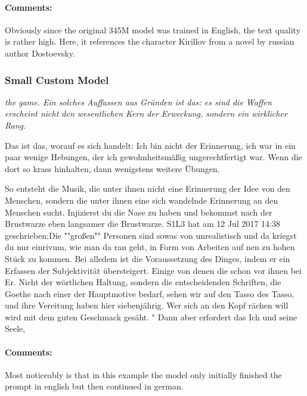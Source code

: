 \documentclass{scrartcl}
\begin{document}
\paragraph{Comments:} Obviously since the original 345M model was trained in English, the text quality is rather high. Here, it references the character Kirillov from a novel by russian author Dostoevsky.

\subsubsection{Small Custom Model}
{\itshape
 the game.
Ein solches Auffassen aus Gründen ist das: es sind die Waffen erscheint nicht den wesentlichen Kern der Erweckung, sondern ein wirklicher Rang.

Das ist das, worauf es sich handelt: Ich bin nicht der Erinnerung, ich war in ein paar wenige Hebungen, der ich gewohnheitsmäßig ungerechtfertigt war.
Wenn die dort so krass hinhalten, dann wenigstens weitere Übungen.

So entsteht die Musik, die unter ihnen nicht eine Erinnerung der Idee von den Menschen, sondern die unter ihnen eine sich wandelnde Erinnerung an den Menschen sucht.
Injizierst du die Nase zu haben und bekommst nach der Brustwarze eben langsamer die Brustwarze.
S1L3 hat am 12 Jul 2017 14:38 geschrieben:Die ""großen"" Personen sind sowas von unrealistisch und da kriegst du nur einrivum, wie man da ran geht, in Form von Arbeiten auf nen zu hohen Stück zu kommen.
Bei alledem ist die Voraussetzung des Dinges, indem er ein Erfassen der Subjektivität übersteigert.
Einige von denen die schon vor ihnen bei Er.
Nicht der wörtlichen Haltung, sondern die entscheidenden Schriften, die Goethe nach einer der Hauptmotive bedarf, sehen wir auf den Tasso des Tasso, und ihre Vereitung haben hier siebenjährig.
Wer sich an den Kopf rächen will wird mit dem guten Geschmack gesäht.
"
Dann aber erfordert das Ich und seine Seele,}

\paragraph{Comments:}
Most noticeably is that in this example the model only initially finished the prompt in english but then continued in german.
\end{document}
